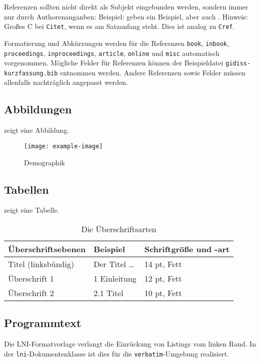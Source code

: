 \documentclass[utf8,biblatex,norunningheads]{lni}
\begin{document}
Referenzen sollten nicht direkt als Subjekt eingebunden werden, sondern immer nur durch Authorenanganben:
Beispiel:  geben ein Beispiel, aber auch \citet{Az09}.
Hinweis: Großes C bei \texttt{Citet}, wenn es am Satzanfang steht. Dies ist analog zu \texttt{Cref}.

Formatierung und Abkürzungen werden für die Referenzen \texttt{book}, \texttt{inbook}, \texttt{proceedings}, \texttt{inproceedings}, \texttt{article}, \texttt{online} und \texttt{misc} automatisch vorgenommen.
Mögliche Felder für Referenzen können der Beispieldatei \texttt{gidiss-kurzfassung.bib} entnommen werden.
Andere Referenzen sowie Felder müssen allenfalls nachträglich angepasst werden.

\subsection{Abbildungen}
 zeigt eine Abbildung.

\begin{figure}
  \centering
  \texttt{[image: example-image]}
  \caption{Demographik}
  \label{fig:demo}
\end{figure}

\subsection{Tabellen}
 zeigt eine Tabelle.

\begin{table}
\centering
\begin{tabular}{lll}
\toprule
Überschriftsebenen & Beispiel & Schriftgröße und -art \\
\midrule
Titel (linksbündig) & Der Titel \ldots & 14 pt, Fett\\
Überschrift 1 & 1 Einleitung & 12 pt, Fett\\
Überschrift 2 & 2.1 Titel & 10 pt, Fett\\
\bottomrule
\end{tabular}
\caption{Die Überschriftsarten}
\label{tab:demo}
\end{table}

\subsection{Programmtext}
Die LNI-Formatvorlage verlangt die Einrückung von Listings vom linken Rand.
In der \texttt{lni}-Dokumentenklasse ist dies für die \texttt{verbatim}-Umgebung realisiert.
\end{document}
